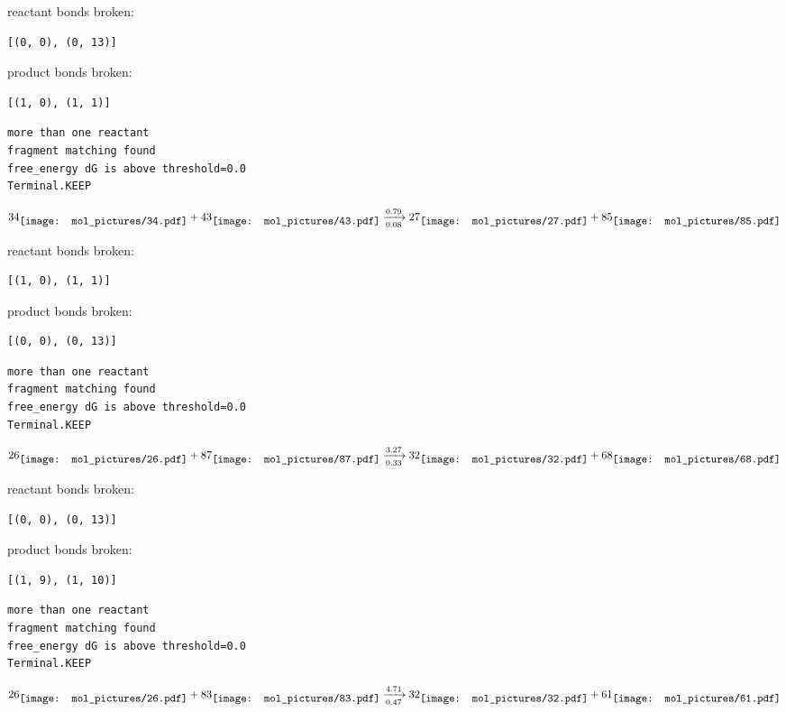 \documentclass{article}
\begin{document}
reactant bonds broken:\begin{verbatim}
[(0, 0), (0, 13)]
\end{verbatim}
product bonds broken:\begin{verbatim}
[(1, 0), (1, 1)]
\end{verbatim}




\vspace{1cm}
\begin{verbatim}
more than one reactant
fragment matching found
free_energy dG is above threshold=0.0
Terminal.KEEP
\end{verbatim}
$$
34
\raisebox{-.5\height}{\texttt{[image: mol\_pictures/34.pdf]}}
+
43
\raisebox{-.5\height}{\texttt{[image: mol\_pictures/43.pdf]}}
\xrightarrow[0.08]{0.79}
27
\raisebox{-.5\height}{\texttt{[image: mol\_pictures/27.pdf]}}
+
85
\raisebox{-.5\height}{\texttt{[image: mol\_pictures/85.pdf]}}
$$


reactant bonds broken:\begin{verbatim}
[(1, 0), (1, 1)]
\end{verbatim}
product bonds broken:\begin{verbatim}
[(0, 0), (0, 13)]
\end{verbatim}




\vspace{1cm}
\begin{verbatim}
more than one reactant
fragment matching found
free_energy dG is above threshold=0.0
Terminal.KEEP
\end{verbatim}
$$
26
\raisebox{-.5\height}{\texttt{[image: mol\_pictures/26.pdf]}}
+
87
\raisebox{-.5\height}{\texttt{[image: mol\_pictures/87.pdf]}}
\xrightarrow[0.33]{3.27}
32
\raisebox{-.5\height}{\texttt{[image: mol\_pictures/32.pdf]}}
+
68
\raisebox{-.5\height}{\texttt{[image: mol\_pictures/68.pdf]}}
$$


reactant bonds broken:\begin{verbatim}
[(0, 0), (0, 13)]
\end{verbatim}
product bonds broken:\begin{verbatim}
[(1, 9), (1, 10)]
\end{verbatim}




\vspace{1cm}
\begin{verbatim}
more than one reactant
fragment matching found
free_energy dG is above threshold=0.0
Terminal.KEEP
\end{verbatim}
$$
26
\raisebox{-.5\height}{\texttt{[image: mol\_pictures/26.pdf]}}
+
83
\raisebox{-.5\height}{\texttt{[image: mol\_pictures/83.pdf]}}
\xrightarrow[0.47]{4.71}
32
\raisebox{-.5\height}{\texttt{[image: mol\_pictures/32.pdf]}}
+
61
\raisebox{-.5\height}{\texttt{[image: mol\_pictures/61.pdf]}}
$$
\end{document}
